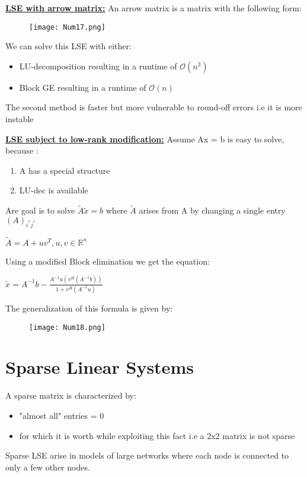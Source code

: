 \documentclass[8pt]{extreport}
\begin{document}
\underline{\textbf{LSE with arrow matrix:}} An arrow matrix is a matrix with the following form:
\begin{figure}[H]
\centering
\texttt{[image: Num17.png]}
\end{figure}
We can solve this LSE with either:
\begin{itemize}
\item LU-decomposition resulting in a runtime of $\mathcal{O}(n^3)$
\item Block GE resulting in a runtime of $\mathcal{O}(n)$
\end{itemize}
The second method is faster but more vulnerable to round-off errors i.e it is more instable

\underline{\textbf{LSE subject to low-rank modification:}} Assume Ax = b is easy to solve, because :
\begin{enumerate}
\item A has a special structure
\item LU-dec is available
\end{enumerate}
Are goal is to solve $\tilde{A}\tilde{x} = b$ where $\tilde{A}$ arises from A by changing a single entry $(A)_{i^*j^*}$\\
\begin{center}
$\tilde{A} = A + uv^T, u,v \in \mathbb{R}^n$
\end{center}
Using a modified Block elimination we get the equation:
\begin{center}
$\tilde{x} = A^{-1}b - \frac{A^{-1}u(v^H(A^{-1}b)) }{1 +  v^H(A^{-1}u)}$

\end{center}
The generalization of this formula is given by:
\begin{figure}[H]
\centering
\texttt{[image: Num18.png]}
\end{figure}

\section{Sparse Linear Systems}

A sparse matrix is characterized by:
\begin{itemize}
\item "almost all" entries = 0
\item for which it is worth while exploiting this fact i.e a 2x2 matrix is not sparse
\end{itemize}
Sparse LSE arise in models of large networks where each node is connected to only a few other nodes.
\end{document}
